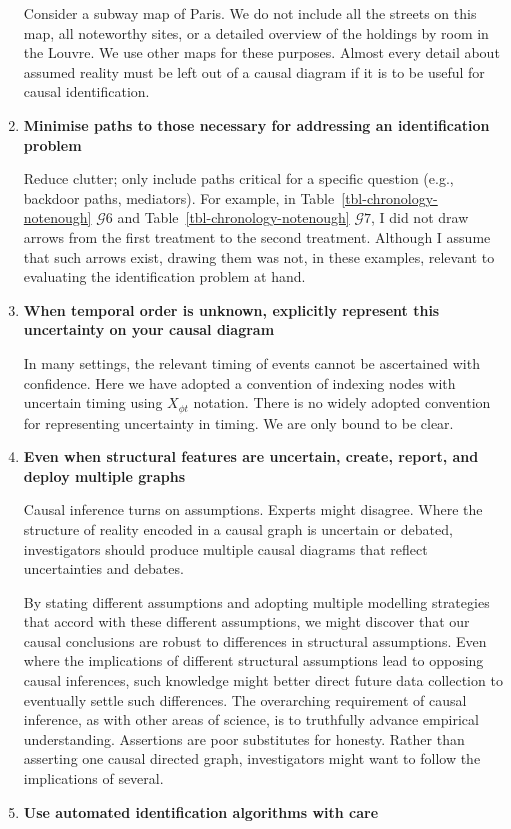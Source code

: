 \documentclass[
  single column]{article}
\begin{document}
\begin{enumerate}
  Consider a subway map of Paris. We do not include all the streets on
  this map, all noteworthy sites, or a detailed overview of the holdings
  by room in the Louvre. We use other maps for these purposes. Almost
  every detail about assumed reality must be left out of a causal
  diagram if it is to be useful for causal identification.
\item
  \textbf{Minimise paths to those necessary for addressing an
  identification problem}

  Reduce clutter; only include paths critical for a specific question
  (e.g., backdoor paths, mediators). For example, in
  Table~\ref{tbl-chronology-notenough} \(\mathcal{G} 6\) and
  Table~\ref{tbl-chronology-notenough} \(\mathcal{G} 7\), I did not draw
  arrows from the first treatment to the second treatment. Although I
  assume that such arrows exist, drawing them was not, in these
  examples, relevant to evaluating the identification problem at hand.
\item
  \textbf{When temporal order is unknown, explicitly represent this
  uncertainty on your causal diagram}

  In many settings, the relevant timing of events cannot be ascertained
  with confidence. Here we have adopted a convention of indexing nodes
  with uncertain timing using \(X_{\phi t}\) notation. There is no
  widely adopted convention for representing uncertainty in timing. We
  are only bound to be clear.
\item
  \textbf{Even when structural features are uncertain, create, report,
  and deploy multiple graphs}

  Causal inference turns on assumptions. Experts might disagree. Where
  the structure of reality encoded in a causal graph is uncertain or
  debated, investigators should produce multiple causal diagrams that
  reflect uncertainties and debates.

  By stating different assumptions and adopting multiple modelling
  strategies that accord with these different assumptions, we might
  discover that our causal conclusions are robust to differences in
  structural assumptions. Even where the implications of different
  structural assumptions lead to opposing causal inferences, such
  knowledge might better direct future data collection to eventually
  settle such differences. The overarching requirement of causal
  inference, as with other areas of science, is to truthfully advance
  empirical understanding. Assertions are poor substitutes for honesty.
  Rather than asserting one causal directed graph, investigators might
  want to follow the implications of several.
\item
  \textbf{Use automated identification algorithms with care}


\end{enumerate}
\end{document}
